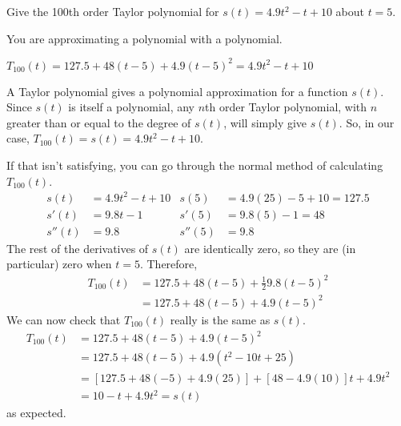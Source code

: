\begin{Mquestion}
Give the 100th order Taylor polynomial for $s(t)=4.9t^2-t+10$ about $t=5$.
\end{Mquestion}
\begin{hint}
You are approximating a polynomial with a polynomial.
\end{hint}
\begin{answer}
$T_{100}(t)=127.5+48(t-5)+4.9(t-5)^2=4.9t^2-t+10$
\end{answer}
\begin{solution}
A Taylor polynomial gives a polynomial approximation for a function $s(t)$. Since $s(t)$ is itself a polynomial, any $n$th order Taylor polynomial, with $n$ greater than or equal to the degree of $s(t)$, will simply give $s(t)$. So, in our case, $T_{100}(t)=s(t)=4.9t^2-t+10$.
\medskip

If that isn't satisfying, you can go through the normal method of calculating $T_{100}(t)$.
\begin{align*}
s(t)&=4.9t^2-t+10 & s(5)&=4.9(25)-5+10=127.5\\
s'(t)&=9.8t-1 & s'(5)&=9.8(5)-1=48\\
s''(t)&=9.8 & s''(5)&=9.8
\end{align*}
The rest of the derivatives of $s(t)$ are identically zero, so they are (in particular) zero when $t=5$. Therefore,
\begin{align*}
T_{100}(t)&=127.5+48(t-5)+\frac{1}{2}9.8(t-5)^2\\
&=127.5+48(t-5)+4.9(t-5)^2
\end{align*}
We can now check that $T_{100}(t)$ really is the same as $s(t)$.
\begin{align*}
T_{100}(t)&=127.5+48(t-5)+4.9(t-5)^2\\
&=127.5+48(t-5)+4.9(t^2-10t+25)\\
&=[127.5+48(-5)+4.9(25)]+[48-4.9(10)]t+4.9t^2\\
&=10-t+4.9t^2=s(t)
\end{align*}
as expected.
\end{solution}

